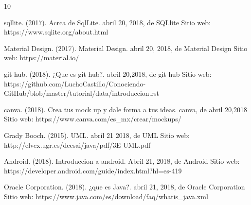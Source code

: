 \begin{thebibliography} {10}

 sqllite. (2017). Acrca de SqlLite. abril 20, 2018, de SQLlite Sitio web: https://www.sqlite.org/about.html

Material Design. (2017). Material Design. abril 20, 2018, de Material Design Sitio web: https://material.io/


 git hub. (2018). ¿Que es git hub?. abril 20,2018, de git hub Sitio web: https://github.com/LuchoCastillo/Conociendo-GitHub/blob/master/tutorial/data/introduccion.rst

 canva. (2018). Crea tus mock up y dale forma a tus ideas. canva, de abril 20,2018 Sitio web: https://www.canva.com/es\_mx/crear/mockups/


 Grady Booch. (2015). UML. abril 21 2018, de UML Sitio web: http://elvex.ugr.es/decsai/java/pdf/3E-UML.pdf


Android. (2018). Introduccion a android. Abril 21, 2018, de Android Sitio web: https://developer.android.com/guide/index.html?hl=es-419


Oracle Corporation. (2018). ¿que es Java?. abril 21, 2018, de Oracle Corporation Sitio web: https://www.java.com/es/download/faq/whatis\_java.xml


\end{thebibliography}

